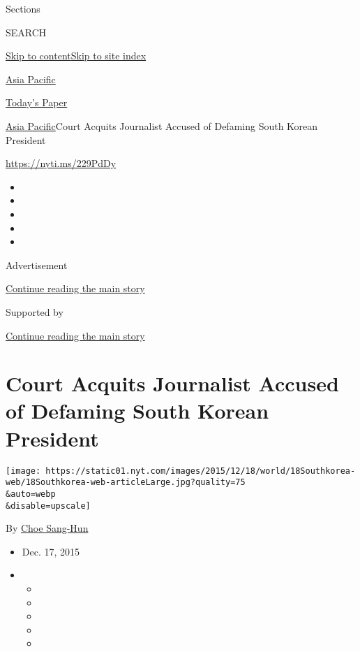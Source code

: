 Sections

SEARCH

\protect\hyperlink{site-content}{Skip to
content}\protect\hyperlink{site-index}{Skip to site index}

\href{https://www.nytimes.com/section/world/asia}{Asia Pacific}

\href{https://myaccount.nytimes.com/auth/login?response_type=cookie\&client_id=vi}{}

\href{https://www.nytimes.com/section/todayspaper}{Today's Paper}

\href{/section/world/asia}{Asia Pacific}\textbar{}Court Acquits
Journalist Accused of Defaming South Korean President

\url{https://nyti.ms/229PdDy}

\begin{itemize}
\item
\item
\item
\item
\item
\end{itemize}

Advertisement

\protect\hyperlink{after-top}{Continue reading the main story}

Supported by

\protect\hyperlink{after-sponsor}{Continue reading the main story}

\hypertarget{court-acquits-journalist-accused-of-defaming-south-korean-president}{%
\section{Court Acquits Journalist Accused of Defaming South Korean
President}\label{court-acquits-journalist-accused-of-defaming-south-korean-president}}

\texttt{[image: https://static01.nyt.com/images/2015/12/18/world/18Southkorea-web/18Southkorea-web-articleLarge.jpg?quality=75\\\&auto=webp\\\&disable=upscale]}

By \href{http://www.nytimes.com/by/choe-sang-hun}{Choe Sang-Hun}

\begin{itemize}
\item
  Dec. 17, 2015
\item
  \begin{itemize}
  \item
  \item
  \item
  \item
  \item
  \end{itemize}
\end{itemize}

